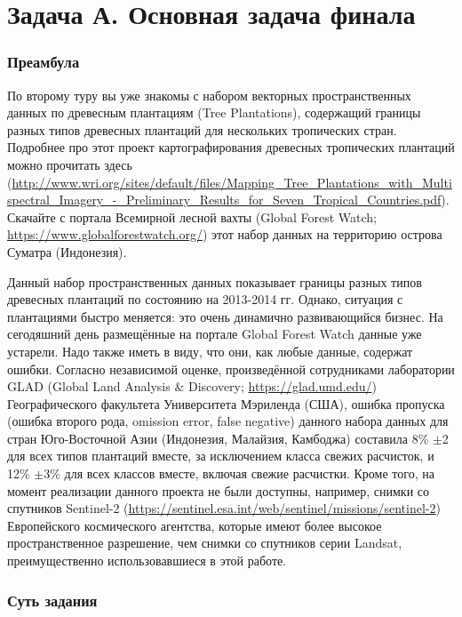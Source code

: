 \section{Задача А. Основная задача финала}

\subsubsection*{Преамбула}

По второму туру вы уже знакомы с набором векторных пространственных данных по древесным плантациям (Tree Plantations), содержащий границы разных типов древесных плантаций для нескольких тропических стран. Подробнее про этот проект картографирования древесных тропических плантаций можно прочитать здесь (\url{http://www.wri.org/sites/default/files/Mapping_Tree_Plantations_with_Multi}\linebreak \url{spectral_Imagery_-_Preliminary_Results_for_Seven_Tropical_Countries.pdf}). \linebreak Скачайте с портала Всемирной лесной вахты (Global Forest Watch; \url{https://www.globalforestwatch.org/}) этот набор данных на территорию острова Суматра (Индонезия).

Данный набор пространственных данных показывает границы разных типов древесных плантаций по состоянию на 2013-2014 гг. Однако, ситуация с плантациями быстро меняется: это очень динамично развивающийся бизнес. На сегодяшний день размещённые на портале Global Forest Watch данные уже устарели. Надо также иметь в виду, что они, как любые данные, содержат ошибки. Согласно независимой оценке, произведённой сотрудниками лаборатории GLAD (Global Land Analysis \& Discovery; \url{https://glad.umd.edu/}) Географического факультета Университета Мэриленда (США), ошибка пропуска (ошибка второго рода, omission error, false negative) данного набора данных для стран Юго-Восточной Азии (Индонезия, Малайзия, Камбоджа) составила 8\% $\pm$2 для всех типов плантаций вместе, за исключением класса свежих расчисток, и 12\% $\pm$3\% для всех классов вместе, включая свежие расчистки. Кроме того, на момент реализации данного проекта не были доступны, например, снимки со спутников Sentinel-2 (\url{https://sentinel.esa.int/web/sentinel/missions/sentinel-2}) Европейского космического агентства, которые имеют более высокое пространственное разрешение, чем снимки со спутников серии Landsat, преимущественно использовавшиеся в этой работе.

\subsubsection*{Суть задания}

